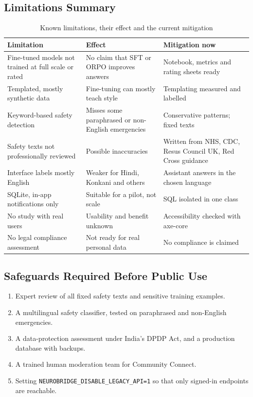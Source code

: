\documentclass[11pt,a4paper]{article}
\newcommand{\code}[1]{\texttt{#1}}
\begin{document}
\subsection{Limitations Summary}
\begin{table}[H]
\centering
\caption{Known limitations, their effect and the current mitigation}
\label{tab:limits}
\small
\begin{tabularx}{\textwidth}{@{}YYY@{}}
\toprule
\textbf{Limitation} & \textbf{Effect} & \textbf{Mitigation now}\\
\midrule
Fine-tuned models not trained at full scale or rated & No claim that SFT or ORPO improves answers & Notebook, metrics and rating sheets ready\\
Templated, mostly synthetic data & Fine-tuning can mostly teach style & Templating measured and labelled\\
Keyword-based safety detection & Misses some paraphrased or non-English emergencies & Conservative patterns; fixed texts\\
Safety texts not professionally reviewed & Possible inaccuracies & Written from NHS, CDC, Resus Council UK, Red Cross guidance\\
Interface labels mostly English & Weaker for Hindi, Konkani and others & Assistant answers in the chosen language\\
SQLite, in-app notifications only & Suitable for a pilot, not scale & SQL isolated in one class\\
No study with real users & Usability and benefit unknown & Accessibility checked with axe-core\\
No legal compliance assessment & Not ready for real personal data & No compliance is claimed\\
\bottomrule
\end{tabularx}
\end{table}

\subsection{Safeguards Required Before Public Use}
\begin{enumerate}
  \item Expert review of all fixed safety texts and sensitive training examples.
  \item A multilingual safety classifier, tested on paraphrased and non-English emergencies.
  \item A data-protection assessment under India's DPDP Act, and a production database with backups.
  \item A trained human moderation team for Community Connect.
  \item Setting \code{NEUROBRIDGE\_DISABLE\_LEGACY\_API=1} so that only signed-in endpoints are reachable.
\end{enumerate}
\end{document}
